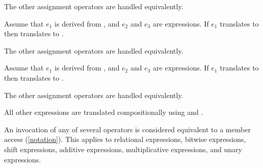 \documentclass[makeidx]{article}
\begin{document}
{{\LMHash{}%
The other assignment operators are handled equivalently.
\EndCase

\LMHash{}%
Assume that $e_1$ is derived from ,
and $e_2$ and $e_3$ are expressions.
If $e_1$ translates to  then 
translates to
.
\EndCase

\LMHash{}%
The other assignment operators are handled equivalently.
\EndCase

\LMHash{}%
Assume that $e_1$ is derived from ,
and $e_2$ and $e_3$ are expressions.
If $e_1$ translates to  then 
translates to
.
\EndCase

\LMHash{}%
The other assignment operators are handled equivalently.
\EndCase

\LMHash{}%
All other expressions are translated compositionally using
 and . 

\vspace{-\baselineskip}\EndCase
%
} %

\LMHash{}%
An invocation of any of several operators is considered equivalent to
a member access
(\ref{notation}).
This applies to relational expressions, bitwise expressions,
shift expressions, additive expressions, multiplicative expressions,
and unary expressions.
}
\end{document}
